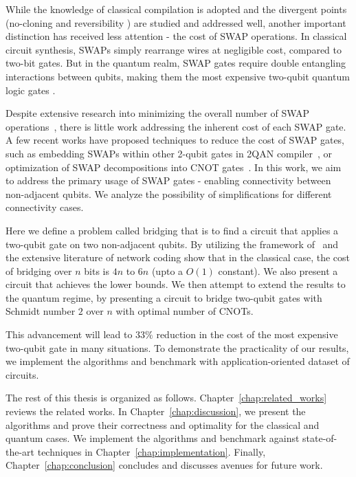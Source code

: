 \documentclass{report}
\begin{document}
While the knowledge of classical compilation is adopted and the divergent points (no-cloning \cite{TODO} and reversibility \cite{TODO}) are studied and addressed well, another important distinction has received less attention - the cost of SWAP operations. In classical circuit synthesis, SWAPs simply rearrange wires at negligible cost, compared to two-bit gates. But in the quantum realm, SWAP gates require double entangling \cite{TODO} interactions between qubits, making them the most expensive two-qubit quantum logic gates \cite{TODO}.

Despite extensive research into minimizing the overall number of SWAP operations~\cite{childs, TODO}, there is little work addressing the inherent cost of each SWAP gate. A few recent works have proposed techniques to reduce the cost of SWAP gates, such as embedding SWAPs within other 2-qubit gates in 2QAN compiler~\cite{lao2021}, or optimization of SWAP decompositions into CNOT gates~\cite{kissinger2019,nash2020}. In this work, we aim to address the primary usage of SWAP gates - enabling connectivity between non-adjacent qubits. We analyze the possibility of simplifications for different connectivity cases.

Here we define a problem called bridging that is to find a circuit that applies a two-qubit gate on two non-adjacent qubits. By utilizing the framework of~\cite{kissinger2019} and the extensive literature of network coding \cite{TODO} show that in the classical case, the cost of bridging over $n$ bits is $4n$ to $6n$ (upto a $O(1)$ constant). We also present a circuit that achieves the lower bounds. We then attempt to extend the results to the quantum regime, by presenting a circuit to bridge two-qubit gates with Schmidt number $2$ over $n$ with optimal number of CNOTs.

This advancement will lead to $33\%$ reduction in the cost of the most expensive two-qubit gate in many situations. To demonstrate the practicality of our results, we implement the algorithms and benchmark with application-oriented dataset of circuits.

The rest of this thesis is organized as follows. Chapter~\ref{chap:related_works} reviews the related works. In Chapter~\ref{chap:discussion}, we present the algorithms and prove their correctness and optimality for the classical and quantum cases. We implement the algorithms and benchmark against state-of-the-art techniques in Chapter~\ref{chap:implementation}. Finally, Chapter~\ref{chap:conclusion} concludes and discusses avenues for future work.
\end{document}
